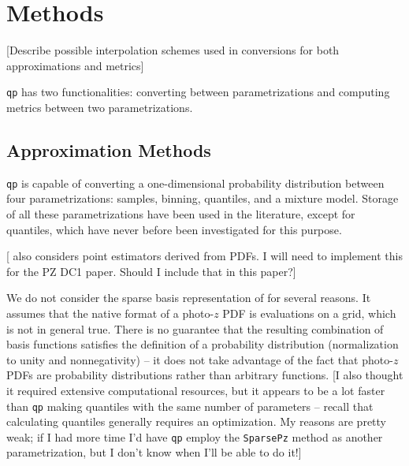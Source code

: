 \documentclass[\docopts]{\docclass}
\begin{document}

\section{Methods}
\label{sec:methods}

[Describe possible interpolation schemes used in conversions for both approximations and metrics]

%
%
%

\texttt{qp} has two functionalities: converting between parametrizations and computing metrics between two parametrizations.

\subsection{Approximation Methods}
\label{sec:approx}


\texttt{qp} is capable of converting a one-dimensional probability distribution between four parametrizations: samples, binning, quantiles, and a mixture model.  Storage of all these parametrizations have been used in the literature, except for quantiles, which have never before been investigated for this purpose.

[\citet{carrasco_kind_sparse_2014} also considers point estimators derived from PDFs.  I will need to implement this for the PZ DC1 paper.  Should I include that in this paper?]

We do not consider the sparse basis representation of \citet{carrasco_kind_sparse_2014} for several reasons.  It assumes that the native format of a photo-$z$ PDF is evaluations on a grid, which is not in general true.  There is no guarantee that the resulting combination of basis functions satisfies the definition of a probability distribution (normalization to unity and nonnegativity) -- it does not take advantage of the fact that photo-$z$ PDFs are probability distributions rather than arbitrary functions.  [I also thought it required extensive computational resources, but it appears to be a lot faster than \texttt{qp} making quantiles with the same number of parameters -- recall that calculating quantiles generally requires an optimization.  My reasons are pretty weak; if I had more time I'd have \texttt{qp} employ the \texttt{SparsePz} method as another parametrization, but I don't know when I'll be able to do it!]
\end{document}
